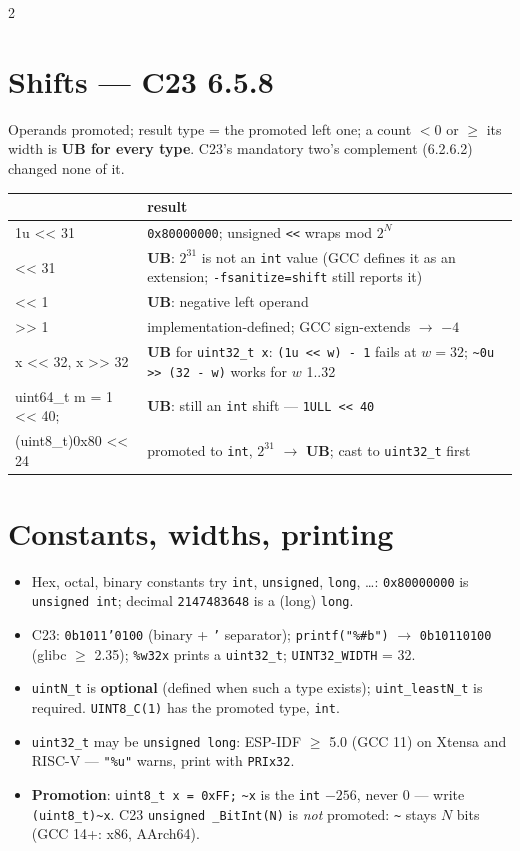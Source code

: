 \documentclass[8pt]{extarticle}
\newcommand\ct[1]{\texttt{#1}}
\begin{document}
\begin{multicols}{2}
\section{Shifts — C23 6.5.8}
Operands promoted; result type = the promoted left one; a count $<0$ or $\ge$ its width
is \textbf{UB for every type}. C23's mandatory two's complement (6.2.6.2) changed none of it.\par
{\scriptsize\setlength{\tabcolsep}{2pt}
\begin{tabular}{@{}>{\ttfamily\raggedright\arraybackslash}p{23mm}>{\raggedright\arraybackslash}p{52mm}@{}}
\toprule
\multicolumn{1}{@{}l}{\textbf{32-bit \ct{int}}} & \textbf{result}\\
\midrule
1u << 31 & \ct{0x80000000}; unsigned \ct{<<} wraps mod $2^N$\\
1 << 31 & \textbf{UB}: $2^{31}$ is not an \ct{int} value (GCC defines it as an extension;
  \ct{-fsanitize=shift} still reports it)\\
-1 << 1 & \textbf{UB}: negative left operand\\
-8 >> 1 & implementation-defined; GCC sign-extends $\rightarrow$ $-4$\\
x << 32, x >> 32 & \textbf{UB} for \ct{uint32\_t x}: \ct{(1u << w) - 1} fails at
  $w = 32$; \ct{\textasciitilde 0u >> (32 - w)} works for $w$ 1..32\\
uint64\_t m = 1 << 40; & \textbf{UB}: still an \ct{int} shift — \ct{1ULL << 40}\\
(uint8\_t)0x80 << 24 & promoted to \ct{int}, $2^{31}$ $\rightarrow$ \textbf{UB}; cast to
  \ct{uint32\_t} first\\
\bottomrule
\end{tabular}}

\section{Constants, widths, printing}
\begin{itemize}
  \item Hex, octal, binary constants try \ct{int}, \ct{unsigned}, \ct{long}, \dots:
        \ct{0x80000000} is \ct{unsigned int}; decimal \ct{2147483648} is a (long) \ct{long}.
  \item C23: \ct{0b1011'0100} (binary + \ct{'} separator); \ct{printf("\%\#b")}
        $\rightarrow$ \ct{0b10110100} (glibc $\ge$ 2.35); \ct{\%w32x} prints a
        \ct{uint32\_t}; \ct{UINT32\_WIDTH} = 32.
  \item \ct{uintN\_t} is \textbf{optional} (defined when such a type exists);
        \ct{uint\_leastN\_t} is required. \ct{UINT8\_C(1)} has the promoted type, \ct{int}.
  \item \ct{uint32\_t} may be \ct{unsigned long}: ESP-IDF $\ge$ 5.0 (GCC 11) on Xtensa and
        RISC-V — \ct{"\%u"} warns, print with \ct{PRIx32}.
  \item \textbf{Promotion}: \ct{uint8\_t x = 0xFF;} \ct{\textasciitilde x} is the
        \ct{int} $-256$, never 0 — write \ct{(uint8\_t)\textasciitilde x}. C23
        \ct{unsigned \_BitInt(N)} is \emph{not} promoted: \ct{\textasciitilde} stays $N$
        bits (GCC 14+: x86, AArch64).
\end{itemize}


\end{multicols}
\end{document}
